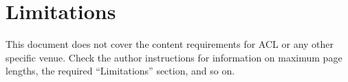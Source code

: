 \section*{Limitations}

This document does not cover the content requirements for ACL or any
other specific venue.  Check the author instructions for
information on
maximum page lengths, the required ``Limitations'' section,
and so on.